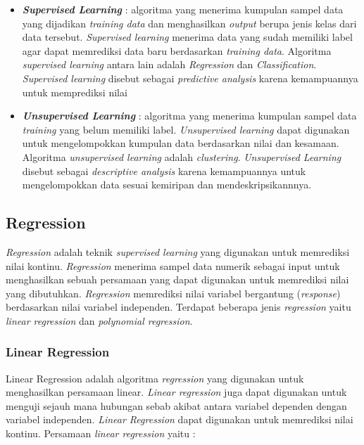 		\begin{itemize}
			\item \textit{\textbf{Supervised Learning}} : algoritma yang  menerima kumpulan sampel data yang dijadikan \textit{training data} dan menghasilkan \textit{output} berupa jenis kelas dari data tersebut. \textit{Supervised learning} menerima data yang sudah memiliki label agar dapat memrediksi data baru berdasarkan \textit{training data}. Algoritma \textit{supervised learning} antara lain adalah \textit{Regression} dan \textit{Classification}. \textit{Supervised learning}  disebut sebagai \textit{predictive analysis} karena kemampuannya untuk memprediksi nilai 
			
			\item \textit{\textbf{Unsupervised Learning}} : algoritma yang menerima kumpulan sampel data \textit{training} yang belum memiliki label. \textit{Unsupervised learning} dapat digunakan untuk mengelompokkan kumpulan data berdasarkan nilai dan kesamaan. Algoritma \textit{unsupervised learning} adalah \textit{clustering}. \textit{Unsupervised Learning} disebut sebagai \textit{descriptive analysis} karena kemampuannya untuk mengelompokkan data sesuai kemiripan dan mendeskripsikannnya. 
		\end{itemize}	


\subsection{Regression} 
 \textit{Regression} adalah  teknik \textit{supervised learning} yang digunakan untuk memrediksi nilai kontinu. \textit{Regression} menerima sampel data numerik sebagai input untuk menghasilkan sebuah persamaan yang dapat digunakan untuk memrediksi nilai yang dibutuhkan. \textit{Regression} memrediksi nilai variabel bergantung (\textit{response}) berdasarkan nilai variabel  independen. Terdapat beberapa jenis \textit{regression} yaitu \textit{linear regression} dan \textit{polynomial regression}.
		
\subsubsection{Linear Regression}   
Linear Regression adalah algoritma \textit{regression} yang digunakan untuk menghasilkan persamaan linear. \textit{Linear regression} juga dapat digunakan untuk menguji sejauh mana hubungan sebab akibat antara variabel dependen dengan variabel independen. \textit{Linear Regression} dapat digunakan untuk memrediksi nilai kontinu. Persamaan \textit{linear regression} yaitu : 
		
